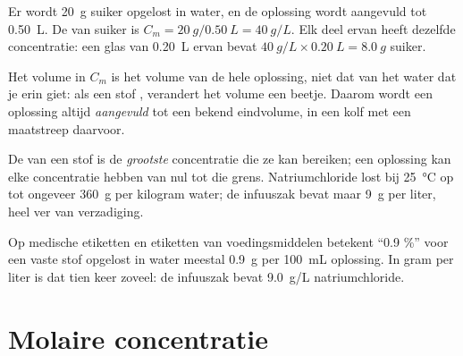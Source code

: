 \begin{example}[Suikerwater]\label{ex:g10:concentration-and-dilution:sugar}
Er wordt \qty{20}{g} suiker opgelost in water, en de oplossing wordt
aangevuld tot \qty{0.50}{L}. De  van suiker is
$C_m = \qty{20}{g} / \qty{0.50}{L} = \qty{40}{g/L}$. Elk deel ervan heeft
dezelfde concentratie: een glas van \qty{0.20}{L} ervan bevat
$\qty{40}{g/L} \times \qty{0.20}{L} = \qty{8.0}{g}$ suiker.
\end{example}


\begin{remark}\label{rem:g10:concentration-and-dilution:volume}
Het volume in $C_m$ is het volume van de hele oplossing, niet dat van het
water dat je erin giet: als een stof , verandert het volume een
beetje. Daarom wordt een oplossing altijd \emph{aangevuld} tot een bekend
eindvolume, in een kolf met een maatstreep daarvoor.
\end{remark}

\begin{remark}\label{rem:g10:concentration-and-dilution:not-solubility}
De  van een stof is de \emph{grootste} concentratie die ze
kan bereiken; een oplossing kan elke concentratie hebben van nul tot die
grens. Natriumchloride lost bij \qty{25}{\celsius} op tot ongeveer
\qty{360}{g} per kilogram water; de infuuszak bevat maar \qty{9}{g} per
liter, heel ver van verzadiging.
\end{remark}

\begin{remark}\label{rem:g10:concentration-and-dilution:percent}
Op medische etiketten en etiketten van voedingsmiddelen betekent ``0.9
\%'' voor een vaste stof opgelost in water meestal \qty{0.9}{g}  per \qty{100}{mL} oplossing. In gram per liter is dat tien keer
zoveel: de infuuszak bevat \qty{9.0}{g/L} natriumchloride.
\end{remark}

\section{Molaire concentratie}

